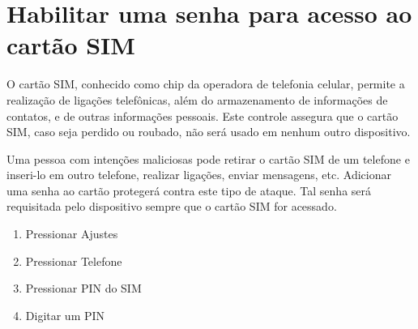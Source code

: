 \section{Habilitar uma senha para acesso ao cart\~ao SIM}

O cart\~ao SIM, conhecido como chip da operadora de telefonia celular, permite a realiza\c c\~ao de liga\c c\~oes telef\^onicas, al\'em do armazenamento de informa\c c\~oes de contatos, e de outras informa\c c\~oes pessoais. Este controle assegura que o cart\~ao SIM, caso seja perdido ou roubado, n\~ao ser\'a usado em nenhum outro dispositivo.

Uma pessoa com inten\c c\~oes maliciosas pode retirar o cart\~ao SIM de um telefone e inseri-lo em outro telefone, realizar liga\c c\~oes, enviar mensagens, etc. Adicionar uma senha ao cart\~ao proteger\'a contra este tipo de ataque. Tal senha ser\'a requisitada pelo dispositivo sempre que o cart\~ao SIM for acessado.

\begin{enumerate}
\item Pressionar Ajustes
\item Pressionar Telefone
\item Pressionar PIN do SIM
\item Digitar um PIN
\end{enumerate}
